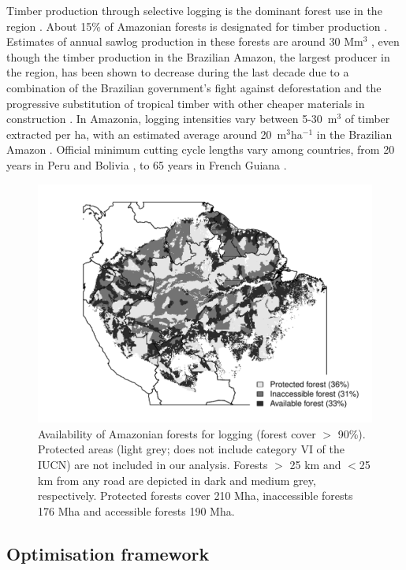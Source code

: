 \documentclass[12pt]{article}
\begin{document}
Timber production through selective logging is the dominant forest use in the region \cite{Blaser2011}. About 15\% of Amazonian forests is designated for timber production \cite{FAO2011}. Estimates of annual sawlog production in these forests are around 30 Mm$^3$ \cite{Lentini2005}, even though the timber production in the Brazilian Amazon, the largest producer in the region, has been shown to decrease during the last decade due to a combination of the Brazilian government's fight against deforestation \cite{Nepstad2014} and the progressive substitution of tropical timber with other cheaper materials in construction \cite{Santos2013}. In Amazonia, logging intensities vary between 5-30~m$^3$ of timber extracted per ha, with an estimated average around 20~m$^3$ha$^{-1}$ in the Brazilian Amazon \cite{Asner2005}. Official minimum cutting cycle lengths vary among countries, from 20 years in Peru and Bolivia \cite{Fredericksen2003,Blaser2011}, to 65 years in French Guiana \cite{Gourlet-Fleury2004}. 

\begin{figure}
    \centering
    \includegraphics[width=\linewidth]{graphs/harv_areas_grey.pdf}
    \caption{Availability of Amazonian forests for logging (forest cover $>$ 90\%). Protected areas (light grey; does not include category VI of the IUCN) are not included in our analysis. Forests $>$ 25 km and $<$25 km from any road are depicted in dark and medium grey, respectively. Protected forests cover 210 Mha, inaccessible forests 176 Mha and accessible forests 190 Mha.}
    \label{fig:pharv}
\end{figure}

\subsection*{Optimisation framework}
\end{document}
